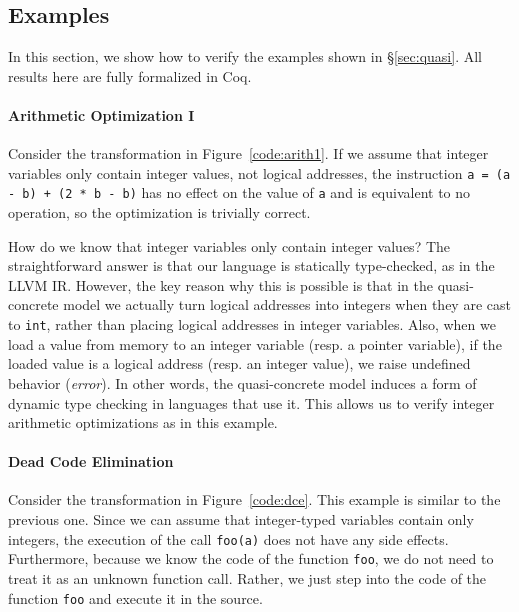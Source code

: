 \subsection{Examples}
\label{sec:intptrcast:compiler-verification:examples}

In this section, we show how to verify the examples shown in \S\ref{sec:quasi}.  All
results here are fully formalized in Coq.

\paragraph{Arithmetic Optimization I}

Consider the transformation in Figure~\ref{code:arith1}. If we assume that integer variables only contain integer
values, not logical addresses, the instruction \texttt{a = (a
  - b) + (2 * b - b)} has no effect on the value of \texttt{a} and is equivalent to no
operation, so the optimization is trivially correct. 

How do we know that integer variables only contain
integer values? The straightforward answer is that our language is statically type-checked, as in the LLVM IR. However, the key reason why this is possible
is that in the quasi-concrete model we actually turn logical addresses into integers
when they are cast to \texttt{int}, rather than placing logical addresses in integer
variables. Also, when we load a value from memory to an integer 
variable (resp. a pointer variable), 
if the loaded value is a logical address (resp. an integer value), we raise undefined
behavior (\ie \emph{error}).
In other words, the quasi-concrete model induces a form of dynamic type
checking in languages that use it. This allows us to verify integer
arithmetic optimizations as in this example.

\paragraph{Dead Code Elimination}

Consider the transformation in Figure~\ref{code:dce}.  This example
is similar to the previous one.  Since we can assume that integer-typed
variables contain only integers, the execution of the call
\texttt{foo(a)} does not have any side effects.
Furthermore, because we know the code of the function
\texttt{foo}, we do not need to treat it as an unknown function call.
Rather, we just step into the code of the function \texttt{foo} and
execute it in the source.%

